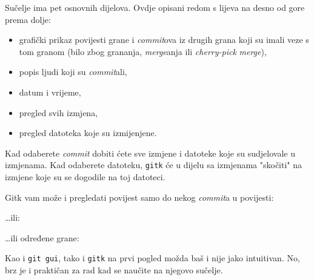 Sučelje ima pet osnovnih dijelova.
Ovdje opisani redom s lijeva na desno od gore prema dolje:

\begin{itemize}
	\item grafički prikaz povijesti grane i \emph{commit}ova iz drugih grana koji su imali veze s tom granom (bilo zbog grananja, \emph{merge}anja ili \emph{cherry-pick} \emph{merge}),
	\item popis ljudi koji su \emph{commit}ali,
	\item datum i vrijeme, 
	\item pregled svih izmjena,
	\item pregled datoteka koje su izmijenjene.
\end{itemize}

Kad odaberete \emph{commit} dobiti ćete sve izmjene i datoteke koje su sudjelovale u izmjenama.
Kad odaberete datoteku, \verb+gitk+ će u dijelu sa izmjenama "skočiti" na izmjene koje su se dogodile na toj datoteci.

Gitk vam može i pregledati povijest samo do nekog \emph{commit}a u povijesti:


\dots{}ili:


\dots{}ili određene grane:


Kao i \verb+git gui+, tako i \verb+gitk+ na prvi pogled možda baš i nije jako intuitivan.
No, brz je i praktičan za rad kad se naučite na njegovo sučelje.

